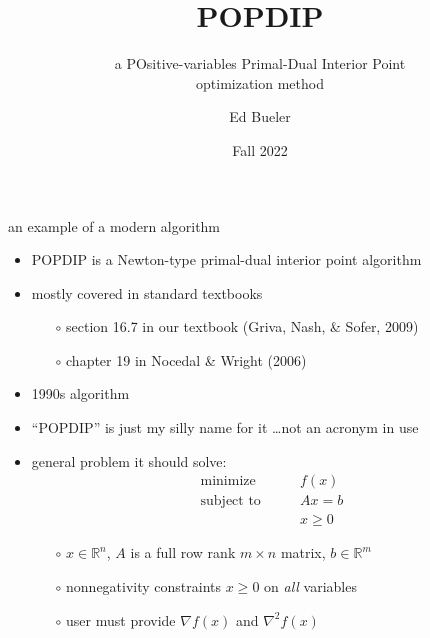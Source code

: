 \documentclass[10pt,hyperref]{beamer}
\title{POPDIP}
\subtitle{a POsitive-variables Primal-Dual Interior Point \\ optimization method}
\author{Ed Bueler}
\institute[MATH 661]{MATH 661 Optimization}
\date{Fall 2022}
\newcommand{\grad}{\nabla}
\newcommand{\RR}{\mathbb{R}}
\begin{document}
\beamertemplatenavigationsymbolsempty

\begin{frame}
  \maketitle
\end{frame}


\begin{frame}{an example of a modern algorithm}

\begin{itemize}
\item POPDIP is a Newton-type primal-dual interior point algorithm
\item mostly covered in standard textbooks
    \begin{itemize}
    \item[$\circ$] section 16.7 in our textbook (Griva, Nash, \& Sofer, 2009)
    \item[$\circ$] chapter 19 in Nocedal \& Wright (2006)
    \end{itemize}
\item 1990s algorithm
\item ``POPDIP'' is just my silly name for it \dots not an acronym in use

\bigskip
\item general problem it should solve:
\begin{equation*}
\begin{matrix}
\text{minimize} \qquad   & f(x) \\
\text{subject to} \qquad & A x = b \\
                         & x \ge 0
\end{matrix}
\end{equation*}

    \begin{itemize}
    \item[$\circ$] $x\in \RR^n$, $A$ is a full row rank $m\times n$ matrix, $b\in\RR^m$
    \item[$\circ$] nonnegativity constraints $x\ge 0$ on \emph{all} variables
    \item[$\circ$] user must provide $\grad f(x)$ and $\grad^2 f(x)$
    \end{itemize}
\end{itemize}
\end{frame}
\end{document}
